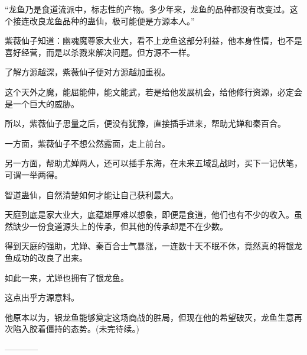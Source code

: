 \begin{this_body}
“龙鱼乃是食道流派中，标志性的产物。多少年来，龙鱼的品种都没有改变过。这个接连改良龙鱼品种的蛊仙，极可能便是方源本人。”

紫薇仙子知道：幽魂魔尊家大业大，看不上龙鱼这部分利益，他本身性情，也不是喜好经营，而是以杀戮来解决问题。但方源不一样。

了解方源越深，紫薇仙子便对方源越加重视。

这个天外之魔，能屈能伸，能文能武，若是给他发展机会，给他修行资源，必定会是一个巨大的威胁。

所以，紫薇仙子思量之后，便没有犹豫，直接插手进来，帮助尤婵和秦百合。

一方面，紫薇仙子不想公然露面，走上前台。

另一方面，帮助尤婵两人，还可以插手东海，在未来五域乱战时，买下一记伏笔，可谓一举两得。

智道蛊仙，自然清楚如何才能让自己获利最大。

天庭到底是家大业大，底蕴雄厚难以想象，即便是食道，他们也有不少的收入。虽然缺少一份食道源头上的传承，但其他的传承却是不在少数。

得到天庭的强助，尤婵、秦百合士气暴涨，一连数十天不眠不休，竟然真的将银龙鱼成功的改良了出来。

如此一来，尤婵也拥有了银龙鱼。

这点出乎方源意料。

他原本以为，银龙鱼能够奠定这场商战的胜局，但现在他的希望破灭，龙鱼生意再次陷入胶着僵持的态势。(未完待续。)

------------

\end{this_body}

